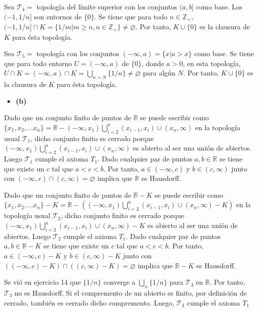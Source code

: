 \documentclass{article}
\begin{document}
Sea $\mathcal{T}_4=$ topología del límite superior con los conjuntos $(a,b]$ como base. Los $(-1, 1/n]$ son entornos de $\{0\}$. Se tiene que para todo $n\in \mathbb{Z}_+$, $(-1, 1/n]\cap K=\{1/m| m\geq n, n\in  \mathbb{Z}_+\}\neq \varnothing$. Por tanto, $K\cup \{0\}$ es la clausura de $K$ para ésta topología.

Sea $\mathcal{T}_5=$ topología  con los conjuntos $(-\infty,a)=\{x|a>x\}$ como base. Se tiene que para todo entorno $U=(-\infty,a)$ de $\{0\}$, donde $a>0$, en esta topología, $U\cap K=(-\infty,a)\cap K= \bigcup_{n>N}\{1/n\}\neq \varnothing$ para algún $N$. Por tanto, $K\cup \{0\}$ es la clausura de $K$ para ésta topología.

\begin{itemize}
\item \bf (b) \rm 
\end{itemize}
Dado que un conjunto finito de puntos de $\mathbb{R}$ se puede escribir como $\{x_1,x_2,...x_n\}=\mathbb{R}-(-\infty, x_1)\bigcup_{i=2}^n (x_{i-1},x_i)\cup (x_n,\infty)$ en la topología usual $\mathcal{T}_1$, dicho conjunto finito es cerrado porque $(-\infty, x_1)\bigcup_{i=2}^n (x_{i-1},x_i)\cup (x_n,\infty)$ es abierto al ser una unión de abiertos. Luego $\mathcal{T}_1$ cumple el axioma $T_1$. Dado cualquier par de puntos $a,b\in \mathbb{R}$ se tiene que existe un $c$ tal que $a<c<b$. Por tanto, $a\in (-\infty,c)$ y $b\in (c,\infty)$ junto con $(-\infty,c)\cap(c,\infty)=\varnothing$ implica que $\mathbb{R}$ es Hausdorff.

Dado que un conjunto finito de puntos de $\mathbb{R}-K$ se puede escribir como $\{x_1,x_2,...x_n\}-K=\mathbb{R}-\left((-\infty, x_1)\bigcup_{i=2}^n (x_{i-1},x_i)\cup (x_n,\infty)-K\right)$ en la topología usual $\mathcal{T}_2$, dicho conjunto finito es cerrado porque $(-\infty, x_1)\bigcup_{i=2}^n (x_{i-1},x_i)\cup (x_n,\infty)-K$ es abierto al ser una unión de abiertos. Luego $\mathcal{T}_2$ cumple el axioma $T_1$. Dado cualquier par de puntos $a,b\in \mathbb{R}-K$ se tiene que existe un $c$ tal que $a<c<b$. Por tanto, $a\in (-\infty,c)-K$ y $b\in (c,\infty)-K$ junto con $((-\infty,c)-K)\cap((c,\infty)-K)=\varnothing$ implica que $\mathbb{R}-K$ es Hausdorff.



Se vió en ejercicio 14 que $\{1/n\}$ converge a $\bigcup_{n}\{1/n\}$ para $\mathcal{T}_3$ en $\mathbb{R}$. Por tanto, $\mathcal{T}_3$ no es Hausdorff. Si el compremento de un abierto es finito, por definición de cerrado, también es cerrado dicho compremento. Luego, $\mathcal{T}_3$ cumple el axioma $T_1$
\end{document}
